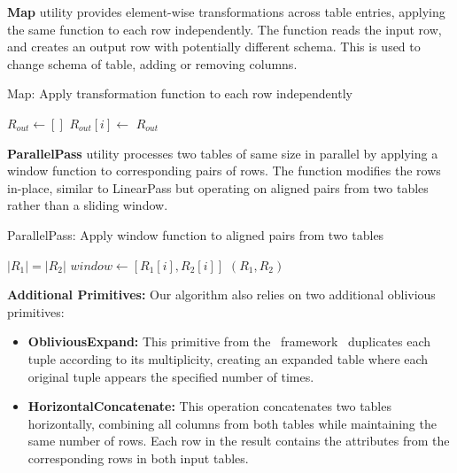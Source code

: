 \textbf{Map} utility provides element-wise transformations across table entries, applying the same function to each row independently. The function reads the input row, and creates an output row with potentially different schema. This is used to change schema of table, adding or removing columns.

\begin{algorithm}[H]
\caption{Map: Apply transformation function to each row independently}
\label{alg:map}
\begin{algorithmic}[1]
    \State $R_{out} \leftarrow []$ 
        \State $R_{out}[i] \leftarrow$ 
    \EndFor
    \State \Return $R_{out}$
\EndFunction
\end{algorithmic}
\end{algorithm}

\textbf{ParallelPass} utility processes two tables of same size in parallel by applying a window function to corresponding pairs of rows. The function modifies the rows in-place, similar to LinearPass but operating on aligned pairs from two tables rather than a sliding window.

\begin{algorithm}[H]
\caption{ParallelPass: Apply window function to aligned pairs from two tables}
\label{alg:parallel-pass}
\begin{algorithmic}[1]
    \Require $|R_1| = |R_2|$ 
        \State $window \leftarrow [R_1[i], R_2[i]]$ 
        \State {} 
    \EndFor
    \State \Return $(R_1, R_2)$ 
\EndFunction
\end{algorithmic}
\end{algorithm}

\textbf{Additional Primitives:} Our algorithm also relies on two additional oblivious primitives:
\begin{itemize}
\item \textbf{ObliviousExpand:} This primitive from the \odbj\ framework~\cite{krastnikov2020} duplicates each tuple according to its multiplicity, creating an expanded table where each original tuple appears the specified number of times.
\item \textbf{HorizontalConcatenate:} This operation concatenates two tables horizontally, combining all columns from both tables while maintaining the same number of rows. Each row in the result contains the attributes from the corresponding rows in both input tables.
\end{itemize}

